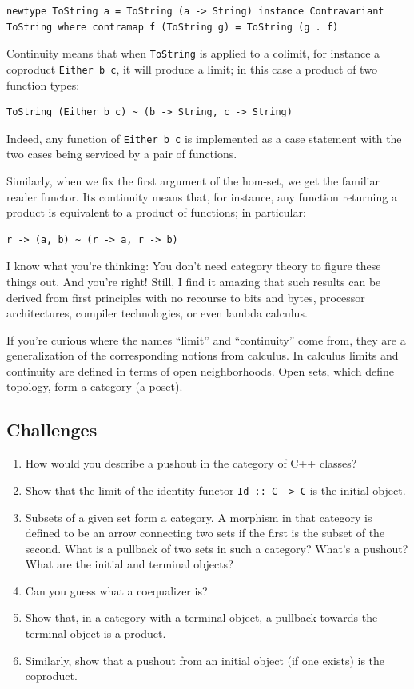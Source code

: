 \begin{verbatim}
newtype ToString a = ToString (a -> String) instance Contravariant ToString where contramap f (ToString g) = ToString (g . f)
\end{verbatim}

Continuity means that when \texttt{ToString} is applied to a colimit,
for instance a coproduct \texttt{Either\ b\ c}, it will produce a limit;
in this case a product of two function types:

\begin{verbatim}
ToString (Either b c) ~ (b -> String, c -> String)
\end{verbatim}

Indeed, any function of \texttt{Either\ b\ c} is implemented as a case
statement with the two cases being serviced by a pair of functions.

Similarly, when we fix the first argument of the hom-set, we get the
familiar reader functor. Its continuity means that, for instance, any
function returning a product is equivalent to a product of functions; in
particular:

\begin{verbatim}
r -> (a, b) ~ (r -> a, r -> b)
\end{verbatim}

I know what you're thinking: You don't need category theory to figure
these things out. And you're right! Still, I find it amazing that such
results can be derived from first principles with no recourse to bits
and bytes, processor architectures, compiler technologies, or even
lambda calculus.

If you're curious where the names ``limit'' and ``continuity'' come
from, they are a generalization of the corresponding notions from
calculus. In calculus limits and continuity are defined in terms of open
neighborhoods. Open sets, which define topology, form a category (a
poset).

\subsection{Challenges}\label{challenges}

\begin{enumerate}
\tightlist
\item
  How would you describe a pushout in the category of C++ classes?
\item
  Show that the limit of the identity functor
  \texttt{Id\ ::\ C\ -\textgreater{}\ C} is the initial object.
\item
  Subsets of a given set form a category. A morphism in that category is
  defined to be an arrow connecting two sets if the first is the subset
  of the second. What is a pullback of two sets in such a category?
  What's a pushout? What are the initial and terminal objects?
\item
  Can you guess what a coequalizer is?
\item
  Show that, in a category with a terminal object, a pullback towards
  the terminal object is a product.
\item
  Similarly, show that a pushout from an initial object (if one exists)
  is the coproduct.
\end{enumerate}

